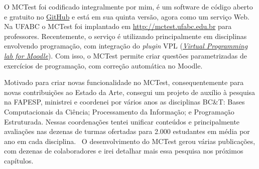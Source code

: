 O MCTest foi codificado integralmente por mim, é um software de código aberto e gratuito no \href{https://github.com/fzampirolli/mctest}{GitHub} e está em sua quinta versão, agora como um serviço Web. Na UFABC o MCTest foi implantado em \url{http://mctest.ufabc.edu.br} para professores. Recentemente, o serviço é utilizando principalmente em disciplinas envolvendo programação, com integração do \textit{plugin} VPL (\textit{\href{https://vpl.dis.ulpgc.es}{Virtual Programming lab for Moodle}}). Com isso, o MCTest permite criar questões parametrizadas de exercícios de programação, com correção automática no Moodle. 

Motivado para criar novas funcionalidade no MCTest, consequentemente para novas contribuições ao Estado da Arte, consegui um projeto de auxílio à pesquisa na FAPESP, ministrei e coordenei por vários anos as disciplinas BC\&T: Bases Computacionais da Ciência; Processamento da Informação; e Programação Estruturada. Nessas coordenações tentei unificar conteúdos e principalmente avaliações nas dezenas de turmas ofertadas  para 2.000 estudantes em média por ano em cada disciplina.
\
O desenvolvimento do MCTest gerou várias publicações, com dezenas de colaboradores e irei detalhar mais essa pesquisa nos próximos capítulos.
